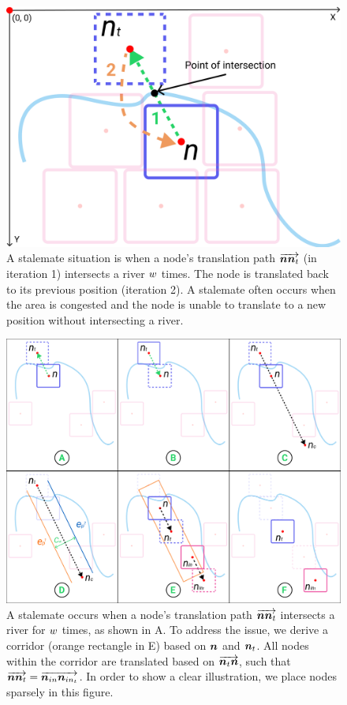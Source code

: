     {
        \begin{figure}[tb!]
            \centering
            \includegraphics[width=\columnwidth]{figure/stalemate.png}
            \caption{A stalemate situation is when a node's translation path $ \protect\overrightarrow{\bm{n}\bm{n}_t} $ (in iteration 1) intersects a river $ w $ times. The node is translated back to its previous position (iteration 2). A stalemate often occurs when the area is congested and the node is unable to translate to a new position without intersecting a river.}
            \label{fig:stalemate}
        \end{figure}
    }

    {
        \begin{figure}[tb!]
            \centering
            \includegraphics[width=\columnwidth]{figure/corridor.png}
            \caption{A stalemate occurs when a node's translation path $ \protect\overrightarrow{\bm{n}\bm{n}_t} $ intersects a river for $ w $ times, as shown in A. To address the issue, we derive a corridor (orange rectangle in E) based on $ \bm{n} $ and $ \bm{n}_t $. All nodes within the corridor are translated based on $ \protect\overrightarrow{\bm{n}_t\bm{n}} $, such that $ \protect\overrightarrow{\bm{n}\bm{n}_{t}} = \protect\overrightarrow{\bm{n}_{in}\bm{n}_{in_t}} $. In order to show a clear illustration, we place nodes sparsely in this figure.}
            \label{fig:corridor}
        \end{figure}
    }

